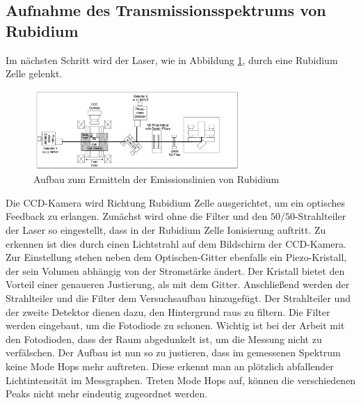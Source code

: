 \subsection{Aufnahme des Transmissionsspektrums von Rubidium}
Im nächsten Schritt wird der Laser, 
wie in Abbildung \ref{fig:Rub},
durch eine Rubidium Zelle gelenkt.
\begin{figure}
    \centering
    \includegraphics[width=0.7\textwidth]{abb/rub.png}
    \caption{Aufbau zum Ermitteln der Emissionslinien von Rubidium \cite{aufbau}}
    \label{fig:Rub}
\end{figure}
Die CCD-Kamera wird Richtung Rubidium Zelle ausgerichtet,
um ein optisches Feedback zu erlangen.
Zunächst wird ohne die Filter und den $50/50$-Strahlteiler der Laser so eingestellt,
dass in der Rubidium Zelle Ionisierung auftritt.
Zu erkennen ist dies durch einen Lichtstrahl auf dem Bildschirm der CCD-Kamera.
Zur Einstellung stehen neben dem Optischen-Gitter ebenfalls ein Piezo-Kristall,
der sein Volumen abhängig von der Stromstärke ändert.
Der Kristall bietet den Vorteil einer genaueren Justierung, 
als mit dem Gitter.
Anschließend werden der Strahlteiler und die Filter dem Versuchsaufbau hinzugefügt.
Der Strahlteiler und der zweite Detektor dienen dazu, den Hintergrund raus zu filtern.
Die Filter werden eingebaut, um die Fotodiode zu schonen.
Wichtig ist bei der Arbeit mit den Fotodioden, 
dass der Raum abgedunkelt ist,
um die Messung nicht zu verfälschen.
Der Aufbau ist nun so zu justieren,
dass im gemessenen Spektrum keine Mode Hops mehr auftreten.
Diese erkennt man an plötzlich abfallender Lichtintensität im Messgraphen.
Treten Mode Hops auf, können die verschiedenen Peaks nicht mehr eindeutig zugeordnet werden.


